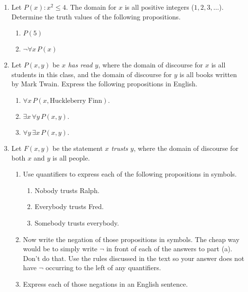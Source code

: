\documentclass[11pt]{amsart}
\begin{document}
\begin{enumerate}

\item Let $P(x): x^2\leq 4$.  The domain for $x$ is all positive integers ($1,2,3,\ldots$). Determine the truth values of the following propositions. 
\begin{enumerate}
\item $P(5)$
\item$\neg \forall x\, P(x)$\\[5pt]
\end{enumerate}

\item Let $P(x,y)$ be {\it $x$ has read $y$}, where the domain of discourse for 
$x$ is all students
in this class, and the domain of discourse for $y$ is all books written by Mark Twain. Express the
following propositions in English. 
\begin{enumerate}
\item $\forall x\, P(x,\text{Huckleberry Finn}).$
\item $\exists x\, \forall y\, P(x,y).$
\item $\forall y\, \exists x\, P(x,y).$\\[5pt]
\end{enumerate}

\item Let $F(x,y)$ be the statement {\it $x$ trusts $y$}, where the domain of discourse
for both $x$ and $y$ is  all people. 
\begin{enumerate}
\item
 Use quantifiers to express each of the following propositions in symbols.
\begin{enumerate}
\item Nobody trusts Ralph.

\item Everybody trusts Fred.

\item Somebody trusts everybody.

\end{enumerate}

\item Now write the negation of those propositions in symbols. The cheap way would be to simply write $\lnot$ in front of each of the answers to part (a). Don't do that. Use the rules discussed in the text so your answer does not have $\lnot$ occurring to the left of any quantifiers.

\item Express each of those negations in an English sentence.\\[5pt]


\end{enumerate}
\end{enumerate}
\end{document}
